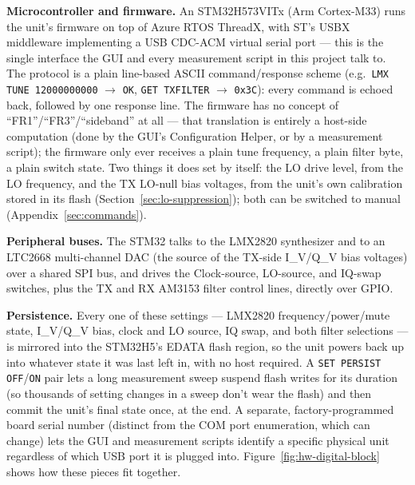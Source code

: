 \textbf{Microcontroller and firmware.} An STM32H573VITx (Arm Cortex-M33) runs the unit's firmware on top of
Azure RTOS ThreadX, with ST's USBX middleware implementing a USB CDC-ACM virtual serial port --- this is the
single interface the GUI and every measurement script in this project talk to. The protocol is a plain
line-based ASCII command/response scheme (e.g.\ \texttt{LMX TUNE 12000000000} $\to$ \texttt{OK}, \texttt{GET
TXFILTER} $\to$ \texttt{0x3C}): every command is echoed back, followed by one response line. The firmware has no
concept of ``FR1''/``FR3''/``sideband'' at all --- that translation is entirely a host-side computation (done by
the GUI's Configuration Helper, or by a measurement script); the firmware only ever receives a plain tune
frequency, a plain filter byte, a plain switch state. Two things it does set by itself: the LO drive level, from the LO
frequency, and the TX LO-null bias voltages, from the unit's own calibration stored in its flash
(Section~\ref{sec:lo-suppression}); both can be switched to manual (Appendix~\ref{sec:commands}).

\textbf{Peripheral buses.} The STM32 talks to the LMX2820 synthesizer and to an LTC2668 multi-channel DAC (the
source of the TX-side I\_V/Q\_V bias voltages) over a shared SPI bus, and drives the Clock-source, LO-source,
and IQ-swap switches, plus the TX and RX AM3153 filter control lines, directly over GPIO.

\textbf{Persistence.} Every one of these settings --- LMX2820 frequency/power/mute state, I\_V/Q\_V bias, clock
and LO source, IQ swap, and both filter selections --- is mirrored into the STM32H5's EDATA flash region, so the
unit powers back up into whatever state it was last left in, with no host required. A \texttt{SET PERSIST
OFF}/\texttt{ON} pair lets a long measurement sweep suspend flash writes for its duration (so thousands of
setting changes in a sweep don't wear the flash) and then commit the unit's final state once, at the end. A
separate, factory-programmed board serial number (distinct from the COM port enumeration, which can change)
lets the GUI and measurement scripts identify a specific physical unit regardless of which USB port it is
plugged into. Figure~\ref{fig:hw-digital-block} shows how these pieces fit together.

